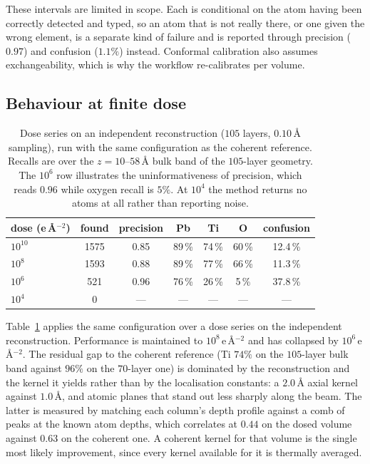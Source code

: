 \documentclass[aps,prb,twocolumn,superscriptaddress,floatfix,nofootinbib]{revtex4-2}
\begin{document}
These intervals are limited in scope. Each is conditional on the atom having been correctly detected and typed, so an atom that is not really there, or one given the wrong element, is a separate kind of failure and is reported through precision ($0.97$) and confusion ($1.1\%$) instead. Conformal calibration also assumes exchangeability, which is why the workflow re-calibrates per volume.

\subsection{Behaviour at finite dose}

\label{sec:dose}

\begin{table}[tb]
  \centering \small
  \begin{tabular}{@{}lcccccc@{}}
    \toprule
    dose (e\,\AA$^{-2}$) & found & precision & Pb & Ti & O & confusion \\
    \midrule
    $10^{10}$ & 1575 & 0.85 & 89\,\% & 74\,\% & 60\,\% & 12.4\,\% \\
    $10^{8}$  & 1593 & 0.88 & 89\,\% & 77\,\% & 66\,\% & 11.3\,\% \\
    $10^{6}$  & \phantom{0}521 & 0.96 & 76\,\% & 26\,\% & \phantom{0}5\,\% & 37.8\,\% \\
    $10^{4}$  & \phantom{000}0 & ---  & --- & --- & --- & --- \\
    \bottomrule
  \end{tabular}
  \caption{Dose series on an independent reconstruction ($105$ layers, $0.10$\,\AA{} sampling),
    run with the same configuration as the coherent reference. Recalls are over the $z=10$--$58$\,\AA{} bulk band of the $105$-layer geometry. The $10^{6}$ row illustrates the uninformativeness of precision, which reads $0.96$ while oxygen recall is $5\%$. At $10^{4}$ the method returns no atoms at all rather than reporting noise.}
  \label{tab:dose}
\end{table}

Table~\ref{tab:dose} applies the same configuration over a dose series on the independent reconstruction. Performance is maintained to $10^{8}$\,e\,\AA$^{-2}$ and has collapsed by $10^{6}$\,e\,\AA$^{-2}$. The residual gap to the coherent reference (Ti $74\%$ on the $105$-layer bulk band against $96\%$ on the $70$-layer one) is dominated by the reconstruction and the kernel it yields rather than by the localisation constants: a $2.0$\,\AA{} axial kernel against $1.0$\,\AA, and atomic planes that stand out less sharply along the beam. The latter is measured by matching each column's depth profile against a comb of peaks at the known atom depths, which correlates at $0.44$ on the dosed volume against $0.63$ on the coherent one. A coherent kernel for that volume is the single most likely improvement, since every kernel available for it is thermally averaged.
\end{document}
